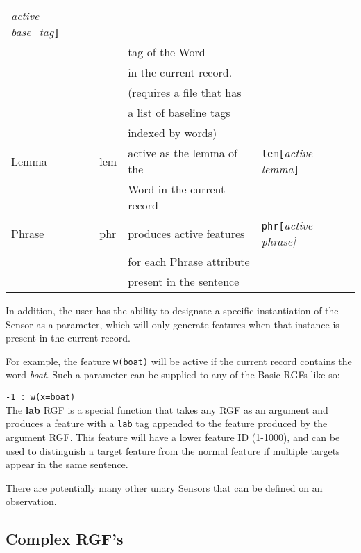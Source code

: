 \documentclass[11pt]{article}
\begin{document}
\begin{tabular}{llll}
{\em active base\_tag}{\tt ]} \\
                &           & tag of the Word           & \\
                &           & in the current record.    & \\
                &           & (requires a file that has & \\
                &           & a list of baseline tags   & \\
                &           & indexed by words)         & \\ 
 Lemma          & lem       & active as the lemma of the& {\tt lem[}{\em active
    lemma}{\tt ]} \\
                &           & Word in the current record& \\
 Phrase         & phr       & produces active features  & {\tt phr[}{\em active
    phrase]}\\
                &           & for each Phrase attribute & \\ 
                &           & present in the sentence   & \\ 
\end{tabular}

\vfill
 
In addition, the user has the ability to designate a specific instantiation 
of the Sensor as a parameter, which will only generate features when
that instance is present in the current record.

For example, the feature {\tt w(boat)} will be active if the current record 
contains the word {\em boat}.  Such a parameter can be supplied to any of the 
Basic RGFs like so:

{\tt -1 : w(x=boat)} \\

The {\bf lab} RGF is a special function that takes any RGF as an argument and
produces a feature with a {\tt lab} tag appended to the feature produced by the
argument RGF.  This feature will have a lower feature ID (1-1000), and can be 
used to distinguish a target feature from the normal feature if multiple targets
appear in the same sentence.

There are potentially many other unary Sensors that can be defined on
an observation.

\subsection*{Complex RGF's}
\end{document}
